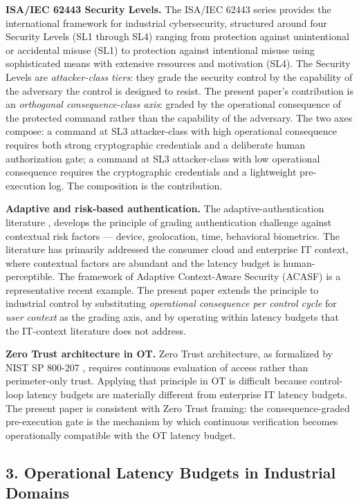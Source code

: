 \textbf{ISA/IEC 62443 Security Levels.} The ISA/IEC 62443 series \cite{ref1}
provides the international framework for industrial cybersecurity,
structured around four Security Levels (SL1 through SL4) ranging from
protection against unintentional or accidental misuse (SL1) to
protection against intentional misuse using sophisticated means with
extensive resources and motivation (SL4). The Security Levels are
\emph{attacker-class tiers}: they grade the security control by the
capability of the adversary the control is designed to resist. The
present paper's contribution is an \emph{orthogonal consequence-class
axis}: graded by the operational consequence of the protected command
rather than the capability of the adversary. The two axes compose: a
command at SL3 attacker-class with high operational consequence requires
both strong cryptographic credentials and a deliberate human
authorization gate; a command at SL3 attacker-class with low operational
consequence requires the cryptographic credentials and a lightweight
pre-execution log. The composition is the contribution.

\textbf{Adaptive and risk-based authentication.} The
adaptive-authentication literature \cite{ref4}, \cite{ref5} develops the
principle of grading authentication challenge against contextual risk
factors --- device, geolocation, time, behavioral biometrics. The
literature has primarily addressed the consumer cloud and enterprise IT
context, where contextual factors are abundant and the latency budget is
human-perceptible. The framework of Adaptive Context-Aware Security
(ACASF) \cite{ref5} is a representative recent example. The present paper
extends the principle to industrial control by substituting
\emph{operational consequence per control cycle} for \emph{user context}
as the grading axis, and by operating within latency budgets that the
IT-context literature does not address.

\textbf{Zero Trust architecture in OT.} Zero Trust architecture, as
formalized by NIST SP 800-207 \cite{ref6}, requires continuous evaluation of
access rather than perimeter-only trust. Applying that principle in OT
is difficult because control-loop latency budgets are materially
different from enterprise IT latency budgets. The present paper is
consistent with Zero Trust framing: the consequence-graded pre-execution
gate is the mechanism by which continuous verification becomes
operationally compatible with the OT latency budget.

\subsection{3. Operational Latency Budgets in Industrial
Domains}\label{operational-latency-budgets-in-industrial-domains}

